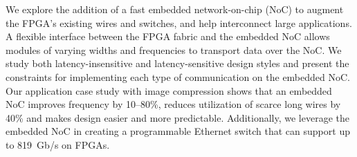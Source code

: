 %
%

We explore the addition of a fast embedded network-on-chip (NoC) to augment the FPGA's existing wires and switches, and help interconnect large applications.
A flexible interface between the FPGA fabric and the embedded NoC allows modules of varying widths and frequencies to transport data over the NoC.
We study both latency-insensitive and latency-sensitive design styles and present the constraints for implementing each type of communication on the embedded NoC.
Our application case study with image compression shows that an embedded NoC improves frequency by 10--80\%, reduces utilization of scarce long wires by 40\% and makes design easier and more predictable.
Additionally, we leverage the embedded NoC in creating a programmable Ethernet switch that can support up to 819~Gb/s on FPGAs.
\vspace{-0.25cm}

%
%